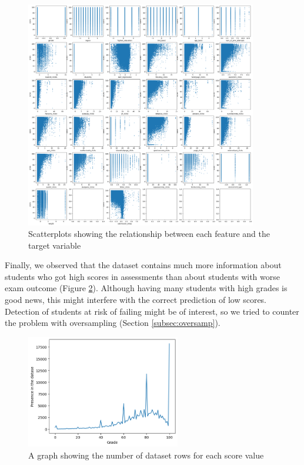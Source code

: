 \documentclass{article}
\begin{document}
\begin{figure}
\centering
\includegraphics[width=0.9\textwidth]{scatterplots.png}
\caption{\label{fig:scatt}Scatterplots showing the relationship between each feature and the target variable}
\end{figure}

Finally, we observed that the dataset contains much more information about students who got high scores in assessments than about students with worse exam outcome (Figure \ref{fig:misrepr}). Although having many students with high grades is good news, this might interfere with the correct prediction of low scores. Detection of students at risk of failing might be of interest, so we tried to counter the problem with oversampling (Section \ref{subsec:oversamp}).

\begin{figure}
\centering
\includegraphics[width=0.6\textwidth]{misrepr.png}
\caption{\label{fig:misrepr}A graph showing the number of dataset rows for each score value}
\end{figure}
\end{document}
